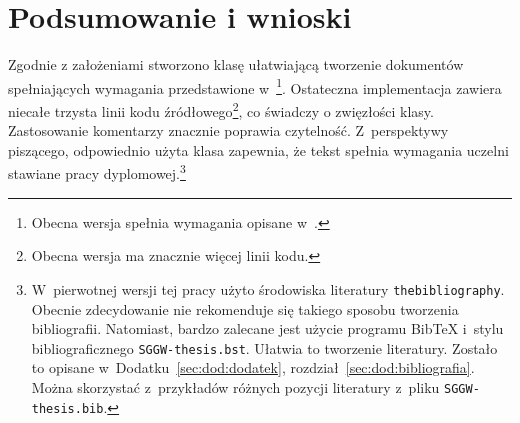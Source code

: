 \documentclass{SGGW-thesis}
\begin{document}
\chapter{Podsumowanie i wnioski}
Zgodnie z założeniami stworzono klasę ułatwiającą tworzenie dokumentów spełniających wymagania przedstawione w~\cite{wymagania}\footnote{Obecna wersja spełnia wymagania opisane w~\cite{wymagania-100}.}. Ostateczna implementacja zawiera niecałe trzysta linii kodu źródłowego\footnote{Obecna wersja ma znacznie więcej linii kodu.}, co świadczy o zwięzłości klasy. Zastosowanie komentarzy znacznie poprawia czytelność. Z~perspektywy piszącego, odpowiednio użyta klasa zapewnia, że tekst spełnia wymagania uczelni stawiane pracy dyplomowej.\footnote{\label{not:bibTeX}W~pierwotnej wersji tej pracy użyto środowiska literatury {\tt thebibliography}. Obecnie zdecydowanie nie rekomenduje się takiego sposobu tworzenia bibliografii. Natomiast, bardzo zalecane jest użycie programu Bib\TeX{} i~stylu bibliograficznego {\tt SGGW-thesis.bst}. Ułatwia to tworzenie literatury. Zostało to opisane w~Dodatku~\ref{sec:dod:dodatek}, rozdział~\ref{sec:dod:bibliografia}. Można skorzystać z~przykładów różnych pozycji literatury z~pliku {\tt SGGW-thesis.bib}.}




\beforelastpage


\end{document}
